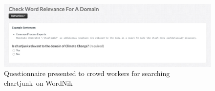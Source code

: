 \begin{figure}
	 \centering
	 \includegraphics[width=\textwidth]{screenshots/questionaire_wordnik_example}
	 \caption{Questionnaire presented to crowd workers for searching \guillemotright chartjunk\guillemotleft~on WordNik}\label{fig:wordnik_example_questionaire}
\end{figure}
